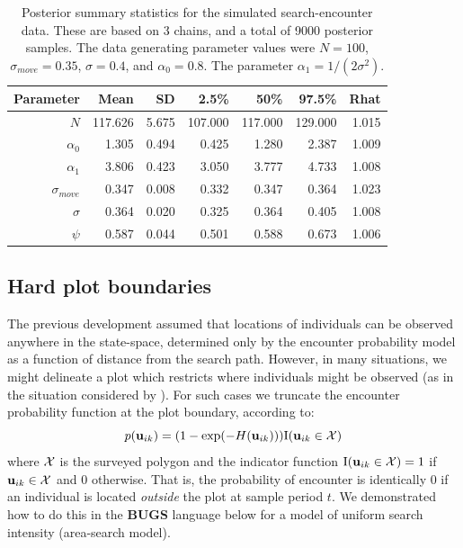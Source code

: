\begin{table}[ht]
\caption{Posterior summary statistics for the simulated
  search-encounter data. These are based on 3 chains,
and a total of 9000 posterior samples.  The data generating parameter values
were $N=100$, $\sigma_{move} = 0.35$, $\sigma = 0.4$, and $\alpha_{0}
= 0.8$. The parameter $\alpha_{1} = 1/(2\sigma^{2})$.
}
\begin{tabular}{rrrrrrr} \hline \hline
 Parameter               & Mean     & SD     & 2.5\%    & 50\%     & 97.5\%   & Rhat   \\ \hline
$N$             & 117.626  & 5.675  & 107.000  & 117.000  & 129.000  & 1.015   \\
$\alpha_0$      & 1.305    & 0.494  & 0.425    & 1.280    & 2.387    & 1.009   \\
$\alpha_1$      & 3.806    & 0.423  & 3.050    & 3.777    & 4.733    & 1.008   \\
$\sigma_{move}$  & 0.347    & 0.008  & 0.332    & 0.347    & 0.364    & 1.023   \\
$\sigma$       & 0.364  &  0.020 &  0.325     &  0.364   & 0.405    & 1.008  \\
$\psi$         & 0.587    & 0.044  & 0.501    & 0.588    & 0.673    & 1.006    \\
\hline
\end{tabular}
\label{searchencounter.tab.simtable}
\end{table}


\subsection{Hard plot boundaries}

The previous development assumed that locations of individuals can be
observed anywhere in the state-space, determined only by the encounter
probability model as a function of distance from the search path.
However, in many situations, we might delineate a plot which restricts
where individuals might be observed (as in the situation considered by
\citet{royle_young:2008}).  For such cases we truncate the encounter
probability function at the plot boundary, according to:
\begin{equation}
p({\bf u}_{ik}) = (1- \exp(-H({\bf u}_{ik}))) \mbox{I}({\bf u}_{ik} \in {\cal X})
\label{search-encounter.eq.hardplot}
\end{equation}
where ${\cal X}$ is the surveyed polygon and the indicator function
$\mbox{I}({\bf u}_{ik} \in {\cal X}) = 1$ if ${\bf u}_{ik} \in {\cal
  X}$ and 0 otherwise.  That is, the probability of encounter is
identically 0 if an individual is located {\it outside} the plot at
sample period $t$.  We demonstrated how to do this in the {\bf BUGS}
language below for a model of uniform search intensity (area-search
model).


